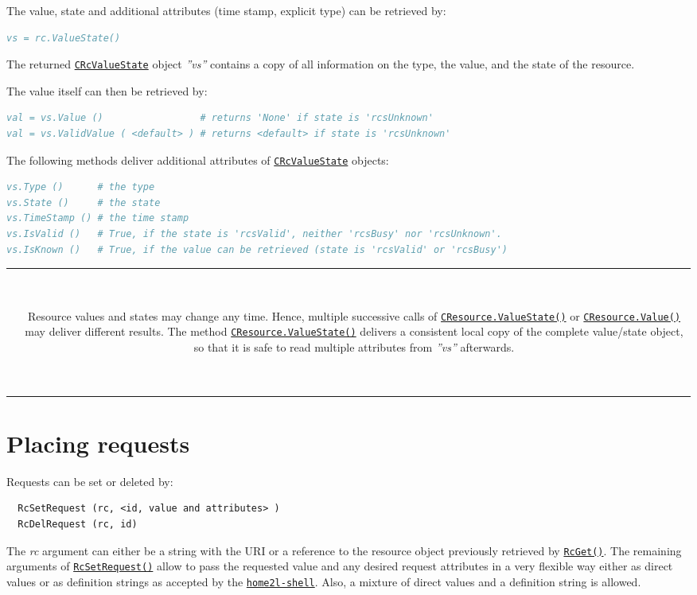 \documentclass[12pt,english,parskip=half,headheight=19pt]{scrreprt}
\newcommand{\warnbox}[1]{
  \par
  \medskip
  \hfill
  \setlength\arrayrulewidth{1pt}
  \begin{tabular}[b]{c|c|}
    
    &
    \,\parbox{0.89\linewidth}{\setlength{\parskip}{0.5em}#1}\,
  \end{tabular}
  \medskip
  \par
}
\newcommand{\idx}[1]{#1\index{#1}}
\newcommand{\reftool}[1]{\hyperref[tool:#1]{\texttt{\idx{#1}}}}
\newcommand{\refapic}[1]{\href{home2l-api_c/index.html}{\mbox{\texttt{#1}}}}            %
\newcommand{\refapipython}[1]{\href{home2l-api_python/index.html}{\mbox{\texttt{#1}}}}  %
\begin{document}
The value, state and additional attributes (time stamp, explicit type) can be retrieved by:
\begin{lstlisting}[language=comments]
vs = rc.ValueState()
\end{lstlisting}

The returned \refapic{CRcValueState} object \textit{''vs''} contains a copy of all information on the type, the value, and the state of the resource.

The value itself can then be retrieved by:
\begin{lstlisting}[language=comments]
val = vs.Value ()                 # returns 'None' if state is 'rcsUnknown'
val = vs.ValidValue ( <default> ) # returns <default> if state is 'rcsUnknown'
\end{lstlisting}

The following methods deliver additional attributes of \refapic{CRcValueState} objects:
\begin{lstlisting}[language=comments]
vs.Type ()      # the type
vs.State ()     # the state
vs.TimeStamp () # the time stamp
vs.IsValid ()   # True, if the state is 'rcsValid', neither 'rcsBusy' nor 'rcsUnknown'.
vs.IsKnown ()   # True, if the value can be retrieved (state is 'rcsValid' or 'rcsBusy')
\end{lstlisting}


\warnbox{
  Resource values and states may change any time. Hence, multiple successive calls of
  \refapipython{CResource.ValueState()} or \refapipython{CResource.Value()} may deliver
  different results.
  The method \refapipython{CResource.ValueState()} delivers a consistent local copy of
  the complete value/state object, so that it is safe to read multiple attributes
  from \textit{''vs''} afterwards.
}





\section{Placing requests}
\label{sec:rules-requests}

Requests can be set or deleted by:
\begin{lstlisting}
  RcSetRequest (rc, <id, value and attributes> )
  RcDelRequest (rc, id)
\end{lstlisting}

The \textit{rc} argument can either be a string with the URI or a reference to the resource object previously retrieved by \refapipython{RcGet()}. The remaining arguments of \refapipython{RcSetRequest()} allow to pass the requested value and any desired request attributes in a very flexible way either as direct values or as definition strings as accepted by the \reftool{home2l-shell}. Also, a mixture of direct values and a definition string is allowed.
\end{document}
